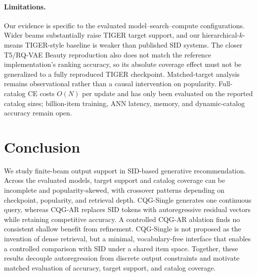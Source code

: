 \documentclass[letterpaper]{article}
\begin{document}
\paragraph{Limitations.}
Our evidence is specific to the evaluated model--search--compute
configurations. Wider beams substantially raise TIGER target support, and our
hierarchical-$k$-means TIGER-style baseline is weaker than published SID
systems. The closer T5/RQ-VAE Beauty reproduction also does not match the
reference implementation's ranking accuracy, so its absolute coverage effect
must not be generalized to a fully reproduced TIGER checkpoint. Matched-target
analysis remains observational rather than a causal intervention on
popularity. Full-catalog CE costs
$O(N)$ per update and has only been evaluated on the reported catalog sizes;
billion-item training, ANN latency, memory, and dynamic-catalog accuracy remain
open.



\section{Conclusion}
We study finite-beam output support in SID-based generative recommendation.
Across the evaluated models, target support and catalog coverage can be
incomplete and popularity-skewed, with crossover patterns depending on
checkpoint, popularity, and retrieval depth. CQG-Single generates one
continuous query, whereas CQG-AR replaces SID tokens with autoregressive
residual vectors while retaining competitive accuracy. A controlled CQG-AR
ablation finds no consistent shallow benefit from refinement. CQG-Single is not proposed as the invention of dense retrieval, but a minimal, vocabulary-free interface that enables a controlled comparison with SID under a shared item space.
Together, these results decouple autoregression from discrete output
constraints and motivate matched evaluation of accuracy, target support,
and catalog coverage.


\FloatBarrier

\end{document}
